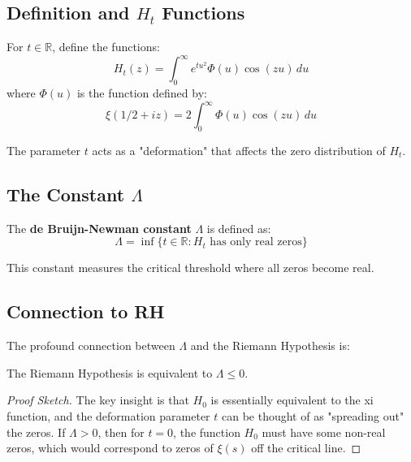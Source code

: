\subsection{Definition and $H_t$ Functions}

\begin{definition}
For $t \in \mathbb{R}$, define the functions:
\begin{equation}
H_t(z) = \int_0^{\infty} e^{tu^2} \Phi(u) \cos(zu) \, du
\end{equation}
where $\Phi(u)$ is the function defined by:
\begin{equation}
\xi(1/2 + iz) = 2\int_0^{\infty} \Phi(u) \cos(zu) \, du
\end{equation}
\end{definition}

The parameter $t$ acts as a "deformation" that affects the zero distribution of $H_t$.

\subsection{The Constant $\Lambda$}

\begin{definition}
The \textbf{de Bruijn-Newman constant} $\Lambda$ is defined as:
\begin{equation}
\Lambda = \inf\{t \in \mathbb{R} : H_t \text{ has only real zeros}\}
\end{equation}
\end{definition}

This constant measures the critical threshold where all zeros become real.

\subsection{Connection to RH}

The profound connection between $\Lambda$ and the Riemann Hypothesis is:

\begin{theorem}[RH Equivalence]
The Riemann Hypothesis is equivalent to $\Lambda \leq 0$.
\end{theorem}

\begin{proof}[Proof Sketch]
The key insight is that $H_0$ is essentially equivalent to the xi function, and the deformation parameter $t$ can be thought of as "spreading out" the zeros. If $\Lambda > 0$, then for $t = 0$, the function $H_0$ must have some non-real zeros, which would correspond to zeros of $\xi(s)$ off the critical line.
\end{proof}

